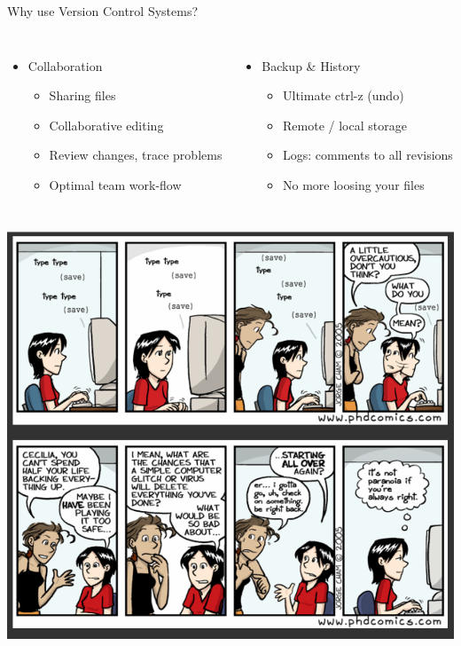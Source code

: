 \documentclass[10pt,xcolor=dvipsnames]{beamer}
\begin{document}
\begin{frame}{Why use Version Control Systems?}
    \begin{columns}
\begin{itemize}
\item Collaboration
	\begin{itemize}
	\item Sharing files
	\item Collaborative editing
	\item Review changes, trace problems
	\item Optimal team work-flow
	\end{itemize}
\end{itemize}
\begin{itemize}
\item Backup \& History
	\begin{itemize}
	\item Ultimate ctrl-z (undo)
	\item Remote / local storage
	\item Logs: comments to all revisions
	\item No more loosing your files
	\end{itemize}
\end{itemize}
    \end{columns}
\centering
    \includegraphics[height=0.6\textheight]{ctrl-s.png}
\end{frame}
\end{document}
